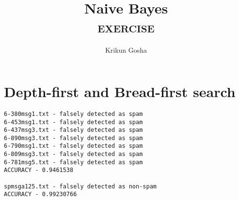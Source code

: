 \documentclass{article}
\title{Naive Bayes \\ \textsc{exercise}}
\author{Krikun Gosha}
\begin{document}
\maketitle

\section{Depth-first and Bread-first search}

\begin{verbatim}
6-380msg1.txt - falsely detected as spam
6-453msg1.txt - falsely detected as spam
6-437msg3.txt - falsely detected as spam
6-890msg3.txt - falsely detected as spam
6-790msg1.txt - falsely detected as spam
6-809msg3.txt - falsely detected as spam
6-781msg5.txt - falsely detected as spam
ACCURACY - 0.9461538

spmsga125.txt - falsely detected as non-spam
ACCURACY - 0.99230766
\end{verbatim}
\end{document}
